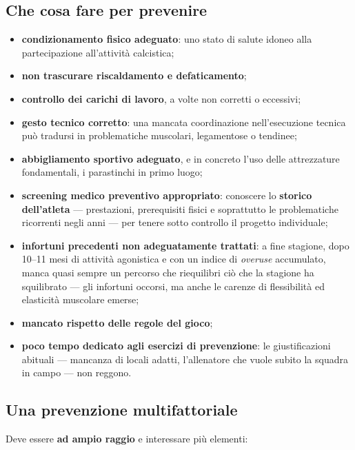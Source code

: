 \subsection{Che cosa fare per prevenire}

\begin{itemize}
  \item \textbf{condizionamento fisico adeguato}: uno stato di salute idoneo alla partecipazione
    all'attività calcistica;
  \item \textbf{non trascurare riscaldamento e defaticamento};
  \item \textbf{controllo dei carichi di lavoro}, a volte non corretti o eccessivi;
  \item \textbf{gesto tecnico corretto}: una mancata coordinazione nell'esecuzione tecnica può
    tradursi in problematiche muscolari, legamentose o tendinee;
  \item \textbf{abbigliamento sportivo adeguato}, e in concreto l'uso delle attrezzature
    fondamentali, i parastinchi in primo luogo;
  \item \textbf{screening medico preventivo appropriato}: conoscere lo \textbf{storico
    dell'atleta} --- prestazioni, prerequisiti fisici e soprattutto le problematiche ricorrenti
    negli anni --- per tenere sotto controllo il progetto individuale;
  \item \textbf{infortuni precedenti non adeguatamente trattati}: a fine stagione, dopo 10--11 mesi
    di attività agonistica e con un indice di \textit{overuse} accumulato, manca quasi sempre un
    percorso che riequilibri ciò che la stagione ha squilibrato --- gli infortuni occorsi, ma anche
    le carenze di flessibilità ed elasticità muscolare emerse;
  \item \textbf{mancato rispetto delle regole del gioco};
  \item \textbf{poco tempo dedicato agli esercizi di prevenzione}: le giustificazioni abituali ---
    mancanza di locali adatti, l'allenatore che vuole subito la squadra in campo --- non reggono.
\end{itemize}

\subsection{Una prevenzione multifattoriale}

Deve essere \textbf{ad ampio raggio} e interessare più elementi:

